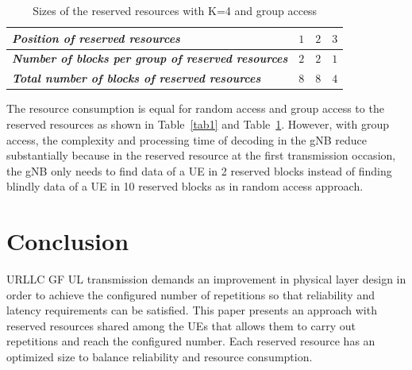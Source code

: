 \documentclass[conference]{IEEEtran}
\begin{document}
\begin{table}[htbp]
\caption{Sizes of the reserved resources with K=4 and group access}
\begin{center}
\begin{tabular}{|p{14em}|p{2em}|p{2em}|p{2em}|}
 \hline
 \textbf{\textit{Position of reserved resources}} & $1$ &$2$ &$3$ \\ 
 \hline
 \textbf{\textit{Number of blocks per group of reserved resources}} & $2$ &$2$ &$1$ \\
 \hline
\textbf{\textit{Total number of blocks of reserved resources}} & $8$ &$8$ &$4$ \\
 
 \hline
\end{tabular}
\label{tab3}
\end{center}
\end{table}

The resource consumption is equal for random access and group access to the reserved resources as shown in Table~\ref{tab1} and Table~\ref{tab3}. However, with group access, the complexity and processing time of decoding in the gNB reduce substantially because in the reserved resource at the first transmission occasion, the gNB only needs to find data of a UE in 2 reserved blocks instead of finding blindly data of a UE in 10 reserved blocks as in random access approach.

\section{Conclusion}\label{IV}

URLLC GF UL transmission demands an improvement in physical layer design in order to achieve the configured number of repetitions so that reliability and latency requirements can be  satisfied. This paper presents an approach with reserved resources shared among the UEs that allows them to carry out repetitions and reach the configured number. Each reserved resource has an optimized size to balance reliability and  resource consumption. 
\end{document}
